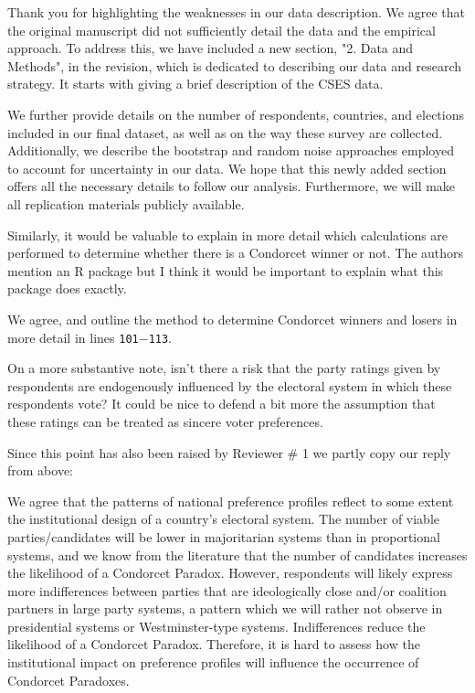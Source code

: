 \documentclass[a4paper, 12pt]{scrartcl}
\theoremstyle{break}
\newenvironment{changes}{\par\color{violet}\par\addvspace{\baselineskip}}{\par\addvspace{\baselineskip}}
\begin{document}
Thank you for highlighting the weaknesses in our data description. We agree that the original manuscript did not sufficiently detail the data and the empirical approach. To address this, we have included a new section, "2. Data and Methods", in the revision, which is dedicated to describing our data and research strategy. It starts with giving a brief description of the CSES data. 

We further provide details on the number of respondents, countries, and elections included in our final dataset, as well as on the way these survey are collected. Additionally, we describe the bootstrap and random noise approaches employed to account for uncertainty in our data. We hope that this newly added section offers all the necessary details to follow our analysis. Furthermore, we will make all replication materials publicly available.

\begin{changes}
Similarly, it would be valuable to explain in more detail which calculations are performed to determine whether there is a Condorcet winner or not. The authors mention an R package but I think it would be important to explain what this package does exactly.
\end{changes}
We agree, and outline the method to determine Condorcet winners and losers in more detail in lines \texttt{101$-$113}.

\begin{changes}
On a more substantive note, isn’t there a risk that the party ratings given by respondents are endogenously influenced by the electoral system in which these respondents vote? It could be nice to defend a bit more the assumption that these ratings can be treated as sincere voter preferences.
\end{changes}
Since this point has also been raised by Reviewer \# 1 we partly copy our reply from above: 

We agree that the patterns of national preference profiles reflect to some extent the institutional design of a country's electoral system. The number of viable parties/candidates will be lower in majoritarian systems than in proportional systems, and we know from the literature that the number of candidates increases the likelihood of a Condorcet Paradox. However, respondents will likely express more indifferences between parties that are ideologically close and/or coalition partners in large party systems, a pattern which we will rather not observe in presidential systems or Westminster-type systems. Indifferences reduce the likelihood of a Condorcet Paradox. Therefore, it is hard to assess how the institutional impact on preference profiles will influence the occurrence of Condorcet Paradoxes. 
\end{document}
